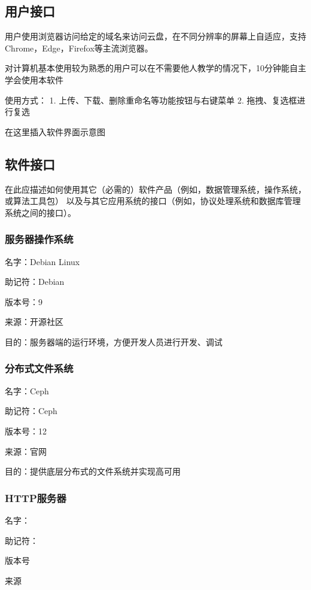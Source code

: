 \subsection{用户接口}

用户使用浏览器访问给定的域名来访问云盘，在不同分辨率的屏幕上自适应，支持Chrome，Edge，Firefox等主流浏览器。

对计算机基本使用较为熟悉的用户可以在不需要他人教学的情况下，10分钟能自主学会使用本软件

使用方式：
1. 上传、下载、删除重命名等功能按钮与右键菜单
2. 拖拽、复选框进行复选

在这里插入软件界面示意图

\subsection{软件接口}

在此应描述如何使用其它（必需的）软件产品（例如，数据管理系统，操作系统，或算法工具包）
以及与其它应用系统的接口（例如，协议处理系统和数据库管理系统之间的接口）。

\subsubsection{服务器操作系统}

名字：Debian Linux

助记符：Debian

版本号：9

来源：开源社区

目的：服务器端的运行环境，方便开发人员进行开发、调试

\subsubsection{分布式文件系统}

名字：Ceph

助记符：Ceph

版本号：12

来源：官网

目的：提供底层分布式的文件系统并实现高可用

\subsubsection{HTTP服务器}

名字：

助记符：

版本号

来源

